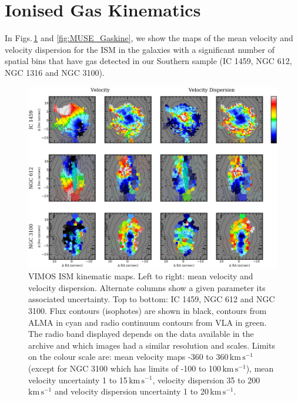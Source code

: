






\section{Ionised Gas Kinematics}
	\label{sec:GasKin}
	In Figs.\,\ref{fig:VIMOS_Gaskine} and \ref{fig:MUSE_Gaskine}, we show the maps of the mean velocity and velocity dispersion for the ISM in the galaxies with a significant number of spatial bins that have gas detected in our Southern sample (IC 1459, NGC 612, NGC 1316 and NGC 3100). 

	\begin{figure}
		\centering
		\includegraphics[height=0.47\textheight]{chapter5/vimos/kin.png}
		\caption[VIMOS ISM kinematic maps]{VIMOS ISM kinematic maps. Left to right: mean velocity and velocity dispersion. Alternate columns show a given parameter its associated uncertainty. Top to bottom: IC 1459, NGC 612 and NGC 3100. Flux contours (isophotes) are shown in black,  contours from ALMA in cyan and radio continuum contours from VLA in green. The radio band displayed depends on the data available in the archive and which images had a similar resolution and scales. Limits on the colour scale are: mean velocity maps -360 to 360\,$\mathrm{km \, s^{-1}}$ (except for NGC 3100 which has limits of -100 to 100\,$\mathrm{km \, s^{-1}}$), mean velocity uncertainty 1 to 15\,$\mathrm{km \, s^{-1}}$, velocity dispersion 35 to 200\,$\mathrm{km \, s^{-1}}$ and velocity dispersion uncertainty 1 to 20\,$\mathrm{km \, s^{-1}}$.} 
		\label{fig:VIMOS_Gaskine}
	\end{figure}


